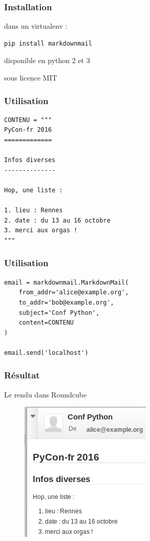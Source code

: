 \documentclass{beamer}
\begin{document}
\begin{frame}[fragile]
\frametitle{Installation}
dans un virtualenv :
\begin{verbatim}
pip install markdownmail
\end{verbatim}

disponible en python 2 et 3

sous licence MIT
\end{frame}


\begin{frame}[fragile]
\frametitle{Utilisation}
\begin{lstlisting}
CONTENU = """
PyCon-fr 2016
=============

Infos diverses
--------------

Hop, une liste :

1. lieu : Rennes
2. date : du 13 au 16 octobre
3. merci aux orgas !
"""
\end{lstlisting}

\end{frame}

\begin{frame}[fragile]
\frametitle{Utilisation}
\begin{lstlisting}
email = markdownmail.MarkdownMail(
    from_addr='alice@example.org',
    to_addr='bob@example.org',
    subject='Conf Python',
    content=CONTENU
)

email.send('localhost')
\end{lstlisting}

\end{frame}


\begin{frame}
\frametitle{Résultat}
Le rendu dans Roundcube

\begin{figure}[b]
    \includegraphics[scale=0.5]{capture_roundcube.png}
\end{figure}
\end{frame}
\end{document}
